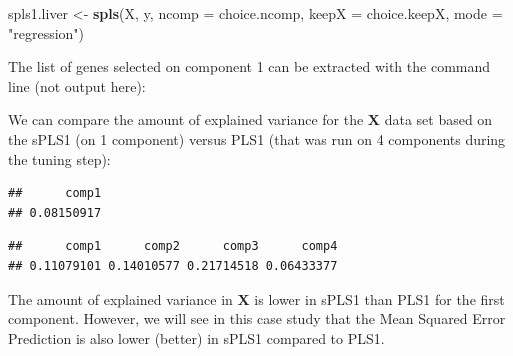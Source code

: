 \documentclass[]{book}
\newenvironment{Shaded}{\begin{snugshade}}{\end{snugshade}}
\newcommand{\KeywordTok}[1]{\textcolor[rgb]{0.13,0.29,0.53}{\textbf{#1}}}
\newcommand{\DataTypeTok}[1]{\textcolor[rgb]{0.13,0.29,0.53}{#1}}
\newcommand{\DecValTok}[1]{\textcolor[rgb]{0.00,0.00,0.81}{#1}}
\newcommand{\StringTok}[1]{\textcolor[rgb]{0.31,0.60,0.02}{#1}}
\newcommand{\OperatorTok}[1]{\textcolor[rgb]{0.81,0.36,0.00}{\textbf{#1}}}
\newcommand{\NormalTok}[1]{#1}
\begin{document}
\begin{Shaded}
\begin{Highlighting}[]
\NormalTok{spls1.liver <-}\StringTok{ }\KeywordTok{spls}\NormalTok{(X, y, }\DataTypeTok{ncomp =}\NormalTok{ choice.ncomp, }\DataTypeTok{keepX =}\NormalTok{ choice.keepX, }
                    \DataTypeTok{mode =} \StringTok{"regression"}\NormalTok{)}
\end{Highlighting}
\end{Shaded}

The list of genes selected on component 1 can be extracted with the
command line (not output here):

\begin{Shaded}
\end{Shaded}

We can compare the amount of explained variance for the
\(\boldsymbol X\) data set based on the sPLS1 (on 1 component) versus
PLS1 (that was run on 4 components during the tuning step):

\begin{Shaded}
\end{Shaded}

\begin{verbatim}
##      comp1 
## 0.08150917
\end{verbatim}

\begin{Shaded}
\end{Shaded}

\begin{verbatim}
##      comp1      comp2      comp3      comp4 
## 0.11079101 0.14010577 0.21714518 0.06433377
\end{verbatim}

The amount of explained variance in \(\boldsymbol X\) is lower in sPLS1
than PLS1 for the first component. However, we will see in this case
study that the Mean Squared Error Prediction is also lower (better) in
sPLS1 compared to PLS1.
\end{document}
